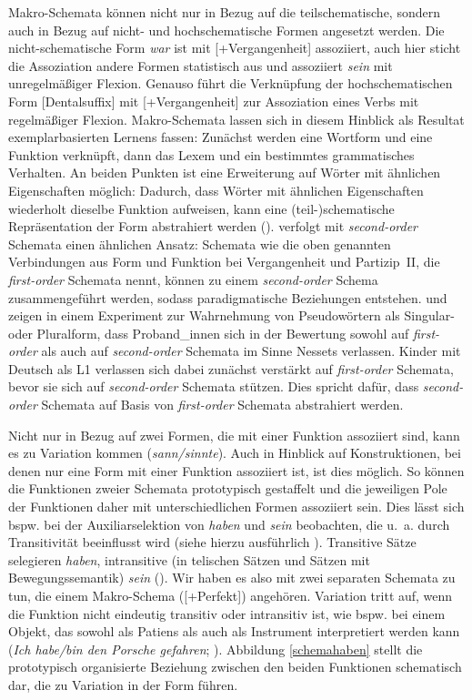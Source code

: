 Makro-Schemata können nicht nur in Bezug auf die teilschematische, sondern auch in Bezug auf nicht- und hochschematische Formen angesetzt werden. Die nicht-schematische Form \textit{war} ist mit [+Vergangenheit] assoziiert, auch hier sticht die Assoziation andere Formen statistisch aus und assoziiert \textit{sein} mit unregelmäßiger Flexion. Genauso führt die Verknüpfung der hochschematischen Form [Dentalsuffix] mit [+Vergangenheit] zur Assoziation eines Verbs mit regelmäßiger Flexion. Makro-Schemata lassen sich in diesem Hinblick als Resultat exemplarbasierten Lernens fassen: Zunächst werden eine Wortform und eine Funktion verknüpft, dann das Lexem und ein bestimmtes grammatisches Verhalten. An beiden Punkten ist eine Erweiterung auf Wörter mit ähnlichen Eigenschaften möglich: Dadurch, dass Wörter mit ähnlichen Eigenschaften wiederholt dieselbe Funktion aufweisen, kann eine (teil-)sche\-matische Repräsentation der Form abstrahiert werden (\cite[161]{Schmitt.2019}). \textcite[18--21]{Nesset.2008} verfolgt mit \textit{second-order} Schemata einen ähnlichen Ansatz: Schemata wie die oben genannten Verbindungen aus Form und Funktion bei Vergangenheit und Partizip~II, die \textcite[18--21]{Nesset.2008} \textit{first-order} Schemata nennt, können zu einem \textit{second-order} Schema zusammengeführt werden, sodass paradigmatische Beziehungen entstehen. \textcite{Kopcke.2017} und \textcite{Kopcke.2021} zeigen in einem Experiment zur Wahrnehmung von Pseudowörtern als Singular- oder Pluralform, dass Proband\_innen sich in der Bewertung sowohl auf \textit{first-order} als auch auf \textit{second-order} Schemata im Sinne Nessets verlassen. Kinder mit Deutsch als L1 verlassen sich dabei zunächst verstärkt auf \textit{first-order} Schemata, bevor sie sich auf \textit{second-order} Schemata stützen. Dies spricht dafür, dass \textit{second-order} Schemata auf Basis von \textit{first-order} Schemata abstrahiert werden.  
  

Nicht nur in Bezug auf zwei Formen, die mit einer Funktion assoziiert sind, kann es zu Variation kommen (\textit{sann/sinnte}). Auch in Hinblick auf Konstruktionen, bei denen nur eine Form mit einer Funktion assoziiert ist, ist dies möglich. So können die Funktionen zweier Schemata prototypisch gestaffelt und die jeweiligen Pole der Funktionen daher mit unterschiedlichen Formen assoziiert sein. Dies lässt sich bspw. bei der Auxiliarselektion von \textit{haben} und \textit{sein} beobachten, die u.~a. durch Transitivität beeinflusst wird (siehe hierzu ausführlich ). Transitive Sätze selegieren \textit{haben}, intransitive (in telischen Sätzen und Sätzen mit Bewegungssemantik) \textit{sein} (\cite[316--319]{Gillmann.2016}). Wir haben es also mit zwei separaten Schemata zu tun, die einem Makro-Schema ([+Perfekt]) angehören. Variation tritt auf, wenn die Funktion nicht eindeutig transitiv oder intransitiv ist, wie bspw. bei einem Objekt, das sowohl als Patiens als auch als Instrument interpretiert werden kann (\textit{Ich habe/bin den Porsche gefahren};  \cite[282]{Gillmann.2016}). Abbildung \ref{schemahaben} stellt die prototypisch organisierte Beziehung zwischen den beiden Funktionen schematisch dar, die zu Variation in der Form führen. 

